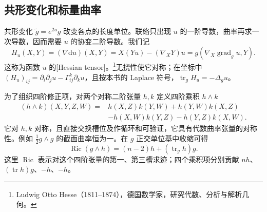 \subsection{共形变化和标量曲率}
\label{g3:subsec:0304:02}

共形变化 \(\widetilde g=e^{2u}g\) 改变各点的长度单位。联络只出现 \(u\) 的一阶导数，曲率再求一次导数，因而需要 \(u\) 的协变二阶导数。我们记
\[
	H_u(X,Y)=(\nabla\mathrm du)(X,Y)
	=X(Yu)-(\nabla_XY)u
	=g(\nabla_X\operatorname{grad}_g u,Y).
\]
这称为函数 \(u\) 的[Hessian tensor]。\footnote{Ludwig Otto Hesse（1811--1874），德国数学家，研究代数、分析与解析几何。}无挠性使它对称；在坐标中 \((H_u)_{ij}=\partial_i\partial_j u-\Gamma^k_{ij}\partial_ku\)，且按本书的 Laplace 符号，\(\operatorname{tr}_gH_u=-\Delta_gu\)。

\ProseParagraphBreak

为了组织四阶修正项，对两个对称二阶张量 \(h,k\) 定义四阶乘积 \(h\wedge k\)
\begin{equation}\label{g3:eq:symmetric-tensor-product}
	\begin{aligned}
	(h\wedge k)(X,Y,Z,W)
	={}&h(X,Z)k(Y,W)+h(Y,W)k(X,Z)\\
	&-h(X,W)k(Y,Z)-h(Y,Z)k(X,W).
	\end{aligned}
\end{equation}
它对 \(h,k\) 对称，且直接交换槽位及作循环和可验证，它具有代数曲率张量的对称性。例如 \(\tfrac12g\wedge g\) 的截面曲率恒为一。在 \(g\) 正交单位基中收缩可得
\begin{equation}\label{g3:eq:metric-wedge-contraction}
	\operatorname{Ric}(g\wedge h)=(n-2)h+(\operatorname{tr}_gh)g.
\end{equation}
这里 \(\operatorname{Ric}\) 表示对这个四阶张量的第一、第三槽求迹；四个乘积项分别贡献 \(nh\)、\((\operatorname{tr}h)g\)、\(-h\)、\(-h\)。

